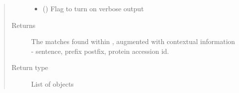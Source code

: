 \documentclass[letterpaper,10pt,english]{sphinxmanual}
\begin{document}
\begin{fulllineitems}
\begin{quote}
\begin{description}
\begin{itemize}
\item {} 
 (\sphinxstyleliteralemphasis{\sphinxupquote{, }}\sphinxstyleliteralemphasis{\sphinxupquote{, }}) \textendash{} Flag to turn on verbose output

\end{itemize}

\item[{Returns}] \leavevmode
{} \textendash{} The matches found within , augmented with contextual information - sentence, prefix
postfix, protein accession id.

\item[{Return type}] \leavevmode
List of {\hyperref[\detokenize{classes:pyresid.MatchClass}]{}} objects

\end{description}\end{quote}

\end{fulllineitems}

\end{document}
